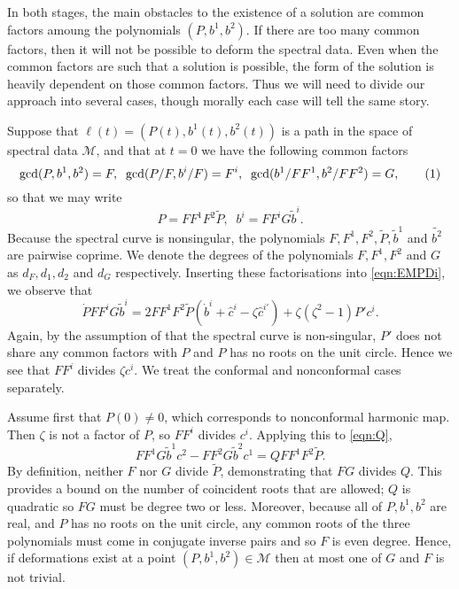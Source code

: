In both stages, the main obstacles to the existence of a solution are common factors amoung the polynomials $(P,b^1,b^2)$. If there are too many common factors, then it will not be possible to deform the spectral data. Even when the common factors are such that a solution is possible, the form of the solution is heavily dependent on those common factors. Thus we will need to divide our approach into several cases, though morally each case will tell the same story.

Suppose that $\ell(t) = (P(t),b^1(t),b^2(t))$ is a path in the space of spectral data $\mathcal{M}$, and that at $t=0$ we have the following common factors
\[
\gcd(P,b^1,b^2) = F,\;\; \gcd(P/F,b^i/F) = F^i,\;\; \gcd(b^1/FF^1, b^2/FF^2) = G,
\labelthis{eqn:common factors}
\]
so that we may write
\[
P = F F^1 F^2 \tilde{P},\;\; b^i = F F^i G \tilde{b}^i.
\]
Because the spectral curve is nonsingular, the polynomials $F,F^1,F^2,\tilde{P},\tilde{b}^1$ and $\tilde{b^2}$ are pairwise coprime. We denote the degrees of the polynomials $F, F^1, F^2$ and $G$ as $d_F,d_1,d_2$ and $d_G$ respectively. Inserting these factorisations into \eqref{eqn:EMPDi}, we observe that
\[
\dot{P} F F^i G \tilde{b}^i = 2 F F^1 F^2 \tilde{P} (\dot{b}^i + \hat{c}^i - ζ\hat{c}^{i\prime}) + ζ(ζ^2-1 ) P'c^i.
\]
Again, by the assumption of that the spectral curve is non-singular, $P'$ does not share any common factors with $P$ and $P$ has no roots on the unit circle. Hence we see that $FF^i$ divides $ζc^i$. We treat the conformal and nonconformal cases separately.

Assume first that $P(0)\neq 0$, which corresponds to nonconformal harmonic map. Then $ζ$ is not a factor of $P$, so $FF^i$ divides $c^i$. Applying this to \eqref{eqn:Q},
\[
FF^1G\tilde{b}^1 c^2 - FF^2G\tilde{b}^2 c^1 = Q FF^1F^2\tilde{P}.
\]
By definition, neither $F$ nor $G$ divide $\tilde{P}$, demonstrating that $FG$ divides $Q$. This provides a bound on the number of coincident roots that are allowed; $Q$ is quadratic so $FG$ must be degree two or less. Moreover, because all of $P,b^1,b^2$ are real, and $P$ has no roots on the unit circle, any common roots of the three polynomials must come in conjugate inverse pairs and so $F$ is even degree. Hence, if deformations exist at a point $(P,b^1,b^2)\in\mathcal{M}$ then at most one of $G$ and $F$ is not trivial.

